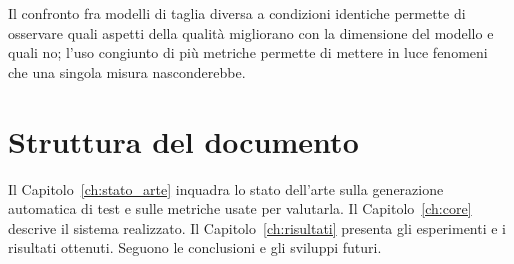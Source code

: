 Il confronto fra modelli di taglia diversa a condizioni identiche permette di
osservare quali aspetti della qualità migliorano con la dimensione del modello
e quali no; l'uso congiunto di più metriche permette di mettere in luce
fenomeni che una singola misura nasconderebbe.

\section{Struttura del documento}

Il Capitolo~\ref{ch:stato_arte} inquadra lo stato dell'arte sulla generazione
automatica di test e sulle metriche usate per valutarla. Il
Capitolo~\ref{ch:core} descrive il sistema realizzato. Il
Capitolo~\ref{ch:risultati} presenta gli esperimenti e i risultati ottenuti.
Seguono le conclusioni e gli sviluppi futuri.
